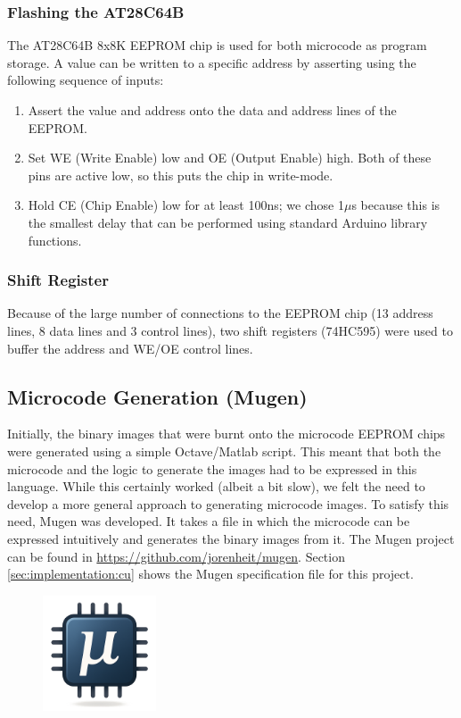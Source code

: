 \subsubsection{Flashing the AT28C64B}
The AT28C64B 8x8K EEPROM chip is used for both microcode as program storage. A value can be written to a specific address by asserting  using the following sequence of inputs:
\begin{enumerate}
\item Assert the value and address onto the data and address lines of the EEPROM.
\item Set WE (Write Enable) low and OE (Output Enable) high. Both of these pins are active low, so this puts the chip in write-mode.
\item Hold CE (Chip Enable) low for at least 100ns; we chose 1$\mu$s because this is the smallest delay that can be performed using standard Arduino library functions.
\end{enumerate}

\subsubsection{Shift Register}
Because of the large number of connections to the EEPROM chip (13 address lines, 8 data lines and 3 control lines), two shift registers (74HC595) were used to buffer the address and WE/OE control lines.




\subsection{Microcode Generation (Mugen)} \label{sec:utilities:mugen}
Initially, the binary images that were burnt onto the microcode EEPROM chips were generated using a simple Octave/Matlab script. This meant that both the microcode and the logic to generate the images had to be expressed in this language. While this certainly worked (albeit a bit slow), we felt the need to develop a more general approach to generating microcode images. To satisfy this need, Mugen was developed. It takes a file in which the microcode can be expressed intuitively and generates the binary images from it. The Mugen project can be found in \url{https://github.com/jorenheit/mugen}. Section \ref{sec:implementation:cu} shows the Mugen specification file for this project. 

\begin{figure}[H]
  \centering
  \includegraphics[width=0.3\textwidth]{img/mugen_logo}
\end{figure}

